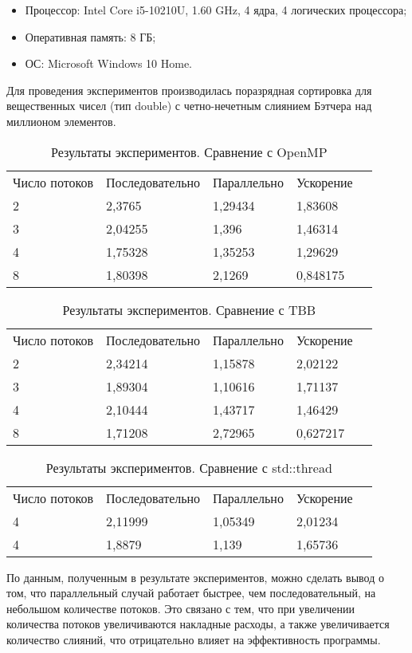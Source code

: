 \documentclass{report}
\begin{document}
\begin{itemize}
\item Процессор: Intel Core i5-10210U, 1.60 GHz, 4 ядра, 4 логических процессора;
\item Оперативная память: 8 ГБ;
\item ОС: Microsoft Windows 10 Home.
\end{itemize}

\par Для проведения экспериментов производилась поразрядная сортировка для вещественных чисел (тип double) с четно-нечетным слиянием Бэтчера над миллионом элементов.

\begin{table}[!h]
\caption{Результаты экспериментов. Сравнение с OpenMP}
\centering
\begin{tabular}{lllll}
Число потоков & Последовательно & Параллельно & Ускорение \\
2 & 2,3765 & 1,29434 & 1,83608 \\
3 & 2,04255 & 1,396 & 1,46314 \\
4 & 1,75328 & 1,35253 & 1,29629 \\
8 & 1,80398 & 2,1269 & 0,848175
\end{tabular}
\end{table}

\begin{table}[!h]
\caption{Результаты экспериментов. Сравнение с TBB}
\centering
\begin{tabular}{lllll}
Число потоков & Последовательно & Параллельно & Ускорение \\
2 & 2,34214 & 1,15878 & 2,02122 \\
3 & 1,89304 & 1,10616 & 1,71137 \\
4 & 2,10444 & 1,43717 & 1,46429 \\
8 & 1,71208 & 2,72965 & 0,627217
\end{tabular}
\end{table}

\begin{table}[!h]
\caption{Результаты экспериментов. Сравнение с std::thread}
\centering
\begin{tabular}{lllll}
Число потоков & Последовательно & Параллельно & Ускорение \\
4 & 2,11999 & 1,05349 & 2,01234 \\
4 & 1,8879 & 1,139 & 1,65736
\end{tabular}
\end{table}

\par По данным, полученным в результате экспериментов, можно сделать вывод о том, что параллельный случай работает быстрее, чем последовательный, на небольшом количестве потоков. Это связано с тем, что при увеличении количества потоков увеличиваются накладные расходы, а также увеличивается количество слияний, что отрицательно влияет на эффективность программы.
\newpage
\end{document}
